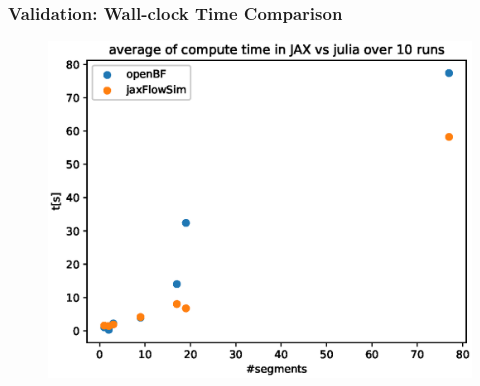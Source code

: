 \documentclass{beamer}
\begin{document}
	\begin{frame}
		\frametitle{Validation: Wall-clock Time Comparison}
		\begin{figure} [H]
			\centering
			\includegraphics[width=0.94\columnwidth]{images/comparison.eps}
			\label{fig:comparison}
		\end{figure}

	\end{frame}
\end{document}

